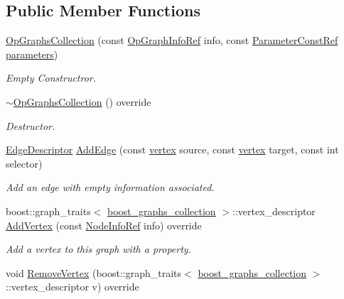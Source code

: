 \subsection*{Public Member Functions}
\begin{DoxyCompactItemize}
\item 
\hyperlink{classOpGraphsCollection_aa142b89a687698e352260755e6e38632}{Op\+Graphs\+Collection} (const \hyperlink{op__graph_8hpp_aa53452ee6eef48921379dd17cb659724}{Op\+Graph\+Info\+Ref} info, const \hyperlink{Parameter_8hpp_a37841774a6fcb479b597fdf8955eb4ea}{Parameter\+Const\+Ref} \hyperlink{structgraphs__collection_adfc2ecaf0a04245a3cfd572c213ef1ed}{parameters})
\begin{DoxyCompactList}\small\item\em Empty Constructror. \end{DoxyCompactList}\item 
\hyperlink{classOpGraphsCollection_aadeed6f2688a706898f7c417d8a01af6}{$\sim$\+Op\+Graphs\+Collection} () override
\begin{DoxyCompactList}\small\item\em Destructor. \end{DoxyCompactList}\item 
\hyperlink{graph_8hpp_a9eb9afea34e09f484b21f2efd263dd48}{Edge\+Descriptor} \hyperlink{classOpGraphsCollection_a5c0f3300131b1b6246b710e8fc10c0dc}{Add\+Edge} (const \hyperlink{graph_8hpp_abefdcf0544e601805af44eca032cca14}{vertex} source, const \hyperlink{graph_8hpp_abefdcf0544e601805af44eca032cca14}{vertex} target, const int selector)
\begin{DoxyCompactList}\small\item\em Add an edge with empty information associated. \end{DoxyCompactList}\item 
boost\+::graph\+\_\+traits$<$ \hyperlink{graph_8hpp_a315f0e4c95fedf30b91945ed29d42332}{boost\+\_\+graphs\+\_\+collection} $>$\+::vertex\+\_\+descriptor \hyperlink{classOpGraphsCollection_afbe13994e2c675945ff79b4bf01163fd}{Add\+Vertex} (const \hyperlink{node__info_8hpp_a345f052eed4efe04f7848fd0ebd015b2}{Node\+Info\+Ref} info) override
\begin{DoxyCompactList}\small\item\em Add a vertex to this graph with a property. \end{DoxyCompactList}\item 
void \hyperlink{classOpGraphsCollection_afb2e5e89d55bac25193625245b7de2fd}{Remove\+Vertex} (boost\+::graph\+\_\+traits$<$ \hyperlink{graph_8hpp_a315f0e4c95fedf30b91945ed29d42332}{boost\+\_\+graphs\+\_\+collection} $>$\+::vertex\+\_\+descriptor v) override

\end{DoxyCompactItemize}
